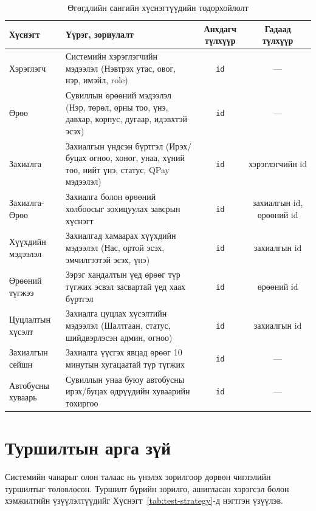 \begin{table}[H]
  \centering
  \caption{Өгөгдлийн сангийн хүснэгтүүдийн тодорхойлолт}
  \label{tab:db-tables}
  \small
  \renewcommand{\arraystretch}{1.2}
  \begin{tabular}{lp{6.2cm}cc}
    \toprule
    \textbf{Хүснэгт} & \textbf{Үүрэг, зориулалт} & \textbf{Анхдагч түлхүүр} & \textbf{Гадаад түлхүүр} \\
    \midrule
    Хэрэглэгч & Системийн хэрэглэгчийн мэдээлэл (Нэвтрэх утас, овог, нэр, имэйл, role) & \texttt{id} & — \\
    \hline
    Өрөө & Сувиллын өрөөний мэдээлэл (Нэр, төрөл, орны тоо, үнэ, давхар, корпус, дугаар, идэвхтэй эсэх) & \texttt{id} & — \\
    \hline
    Захиалга & Захиалгын үндсэн бүртгэл (Ирэх/буцах огноо, хоног, унаа, хүний тоо, нийт үнэ, статус, QPay мэдээлэл) & \texttt{id} & хэрэглэгчийн id \\
    \hline
    Захиалга-Өрөө & Захиалга болон өрөөний холбоосыг зохицуулах завсрын хүснэгт & \texttt{id} & захиалгын id, өрөөний id \\
    \hline
    Хүүхдийн мэдээлэл & Захиалгад хамаарах хүүхдийн мэдээлэл (Нас, ортой эсэх, эмчилгээтэй эсэх, үнэ) & \texttt{id} & захиалгын id \\
    \hline
    Өрөөний түгжээ & Зэрэг хандалтын үед өрөөг түр түгжих эсвэл засвартай үед хаах бүртгэл & \texttt{id} & өрөөний id \\
    \hline
    Цуцлалтын хүсэлт & Захиалга цуцлах хүсэлтийн мэдээлэл (Шалтгаан, статус, шийдвэрлэсэн админ, огноо) & \texttt{id} & захиалгын id \\
    \hline
    Захиалгын сейшн  & Захиалга үүсгэх явцад өрөөг 10 минутын хугацаатай түр түгжих & \texttt{id} & — \\
    \hline
    Автобусны хуваарь & Сувиллын унаа буюу автобусны ирэх/буцах өдрүүдийн хуваарийн тохиргоо & \texttt{id} & — \\
    \bottomrule
  \end{tabular}
\end{table}

\clearpage
\section{Туршилтын арга зүй}

Системийн чанарыг олон талаас нь үнэлэх зорилгоор дөрвөн чиглэлийн туршилтыг төлөвлөсөн. Туршилт бүрийн зорилго, ашигласан хэрэгсэл болон хэмжилтийн үзүүлэлтүүдийг Хүснэгт~\ref{tab:test-strategy}-д нэгтгэн үзүүлэв.

